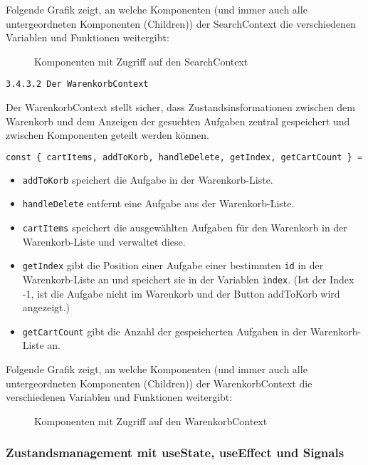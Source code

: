 \newpage
Folgende Grafik zeigt, an welche Komponenten (und immer auch alle untergeordneten Komponenten (Children)) der SearchContext die verschiedenen Variablen und Funktionen weitergibt:
\begin{figure}[H]
\caption{Komponenten mit Zugriff auf den SearchContext \cite{fig:all}}
\end{figure}


\texttt{3.4.3.2 Der WarenkorbContext}

Der WarenkorbContext stellt sicher, dass Zustandsinsformationen zwischen dem Warenkorb und dem Anzeigen der gesuchten Aufgaben zentral gespeichert und zwischen Komponenten geteilt werden können.

\begin{lstlisting}[language=Python]
const { cartItems, addToKorb, handleDelete, getIndex, getCartCount } = useContext(WarenkorbContext);
 \end{lstlisting} 

 \begin{itemize}

  \item \texttt{addToKorb} speichert die Aufgabe in der Warenkorb-Liste.
  \item \texttt{handleDelete} entfernt eine Aufgabe aus der Warenkorb-Liste.
  \item  \texttt{cartItems} speichert die ausgewählten Aufgaben für den Warenkorb in der Warenkorb-Liste und verwaltet diese.
  \item \texttt{getIndex} gibt die Position einer Aufgabe einer bestimmten \texttt{id} in der Warenkorb-Liste an und speichert sie in der Variablen \texttt{index}. (Ist der Index -1, ist die Aufgabe nicht im Warenkorb und der Button addToKorb wird angezeigt.)
  \item \texttt{getCartCount} gibt die Anzahl der gespeicherten Aufgaben in der Warenkorb-Liste an.
 \end{itemize}

 Folgende Grafik zeigt, an welche Komponenten (und immer auch alle untergeordneten Komponenten (Children)) der WarenkorbContext die verschiedenen Variablen und Funktionen weitergibt:
 \begin{figure}[ht]
 \caption{Komponenten mit Zugriff auf den WarenkorbContext \cite{fig:all2}}
 \end{figure}


 \subsubsection{Zustandsmanagement mit useState, useEffect und Signals}

